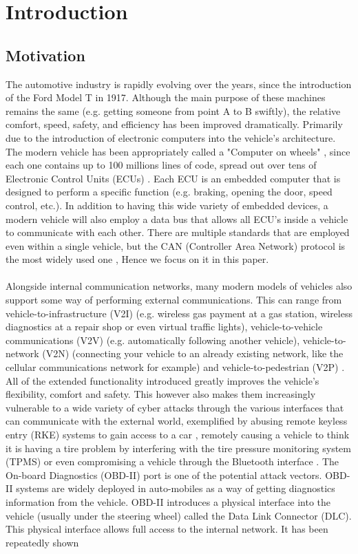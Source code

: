\chapter{Introduction}
\label{sec:introduction}


\section{Motivation}
The automotive industry is rapidly evolving over the years, since the introduction of the Ford Model T in 1917. Although the main purpose of these machines remains the same (e.g. getting someone from point A to B swiftly), the relative comfort, speed, safety, and efficiency has been improved dramatically. Primarily due to the introduction of electronic computers into the vehicle's architecture. The modern vehicle has been appropriately called a "Computer on wheels" \cite{Klinedinst05}, since each one contains up to 100 millions lines of code, spread out over tens of Electronic Control Units (ECUs) \cite{Pike15}. Each ECU is an embedded computer that is designed to perform a specific function (e.g. braking, opening the door, speed control, etc.). In addition to having this wide variety of embedded devices, a modern vehicle will also employ a data bus that allows all ECU's inside a vehicle to communicate with each other. There are multiple standards that are employed even within a single vehicle, but the CAN (Controller Area Network) protocol is the most widely used one \cite{VatiCAN}, Hence we focus on it in this paper. \\ \\ Alongside internal communication networks, many modern models of vehicles also support some way of performing external communications. This can range from vehicle-to-infrastructure (V2I) (e.g. wireless gas payment at a gas station, wireless diagnostics at a repair shop or even virtual traffic lights), vehicle-to-vehicle communications (V2V) (e.g. automatically following another vehicle), vehicle-to-network (V2N) (connecting your vehicle to an already existing network, like the cellular communications network for example) and vehicle-to-pedestrian (V2P) \cite{Kleberger15}\cite{Russel17}\cite{Ahmed}. All of the extended functionality introduced greatly improves the vehicle's flexibility, comfort and safety. This however also makes them increasingly vulnerable to a wide variety of cyber attacks through the various interfaces that can communicate with the external world, exemplified by abusing remote keyless entry (RKE) systems to gain access to a car \cite{KeeLoq}\cite{MillerA}, remotely causing a vehicle to think it is having a tire problem by interfering with the tire pressure monitoring system (TPMS) \cite{MillerA} or even compromising a vehicle through the Bluetooth interface \cite{Kosher2}\cite{Kosher}. The On-board Diagnostics (OBD-II) port is one of the potential attack vectors.  OBD-II systems are widely deployed in auto-mobiles as a way of getting diagnostics information from the vehicle. OBD-II introduces a physical interface into the vehicle (usually under the steering wheel) called the Data Link Connector (DLC). This physical interface allows full access to the internal network. It has been repeatedly shown 